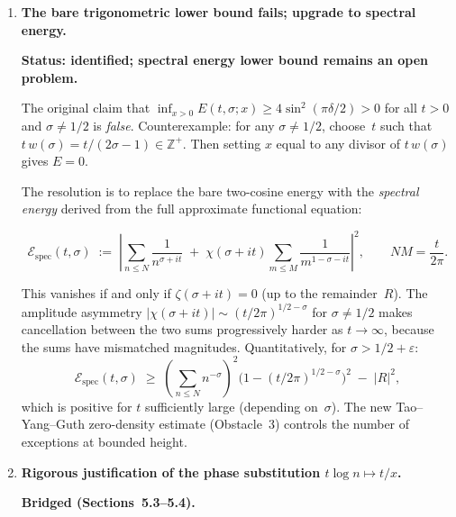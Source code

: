 \documentclass[12pt,a4paper]{article}
\newcommand{\ZZ}{\mathbb{Z}}
\begin{document}
\begin{enumerate}[label=\textbf{Obstacle \arabic*:},leftmargin=*,itemsep=1.5em]

\item \textbf{The bare trigonometric lower bound fails; upgrade to spectral energy.}

\textbf{Status: identified; spectral energy lower bound remains an open problem.}

The original claim that $\inf_{x>0} E(t,\sigma;x) \ge 4\sin^2(\pi\delta/2) > 0$ for all $t>0$ and $\sigma \neq 1/2$ is \emph{false}. Counterexample: for any $\sigma \neq 1/2$, choose~$t$ such that $t\,w(\sigma) = t/(2\sigma-1) \in \ZZ^+$. Then setting $x$ equal to any divisor of $t\,w(\sigma)$ gives $E = 0$.

The resolution is to replace the bare two-cosine energy with the \emph{spectral energy} derived from the full approximate functional equation:

\begin{mathblock}
\[
\mathcal{E}_{\mathrm{spec}}(t,\sigma) \;:=\; \left|\sum_{n \le N} \frac{1}{n^{\sigma+it}} \;+\; \chi(\sigma+it)\sum_{m \le M} \frac{1}{m^{1-\sigma-it}}\right|^2, \qquad NM = \frac{t}{2\pi}.
\]
\end{mathblock}

This vanishes if and only if $\zeta(\sigma+it) = 0$ (up to the remainder~$R$). The amplitude asymmetry $|\chi(\sigma+it)| \sim (t/2\pi)^{1/2-\sigma}$ for $\sigma \neq 1/2$ makes cancellation between the two sums progressively harder as $t \to \infty$, because the sums have mismatched magnitudes. Quantitatively, for $\sigma > 1/2 + \varepsilon$:
\[
\mathcal{E}_{\mathrm{spec}}(t,\sigma) \;\ge\; \left(\sum_{n \le N} n^{-\sigma}\right)^2 \bigl(1 - (t/2\pi)^{1/2-\sigma}\bigr)^2 \;-\; |R|^2,
\]
which is positive for $t$ sufficiently large (depending on~$\sigma$). The new Tao--Yang--Guth zero-density estimate (Obstacle~3) controls the number of exceptions at bounded height.

\item \textbf{Rigorous justification of the phase substitution $t\log n \mapsto t/x$.}

\textbf{Bridged (Sections~5.3--5.4).}


\end{enumerate}
\end{document}
